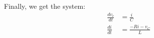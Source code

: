 \documentclass[preview]{standalone}
\begin{document}
\begin{center}
Finally, we get the system: 
            \begin{align*}
                \frac{dv_c}{dt} &= \frac{i}{C} \\
                \frac{di}{dt} &= \frac{-Ri - v_C}{L}
            \end{align*}
\end{center}
\end{document}

